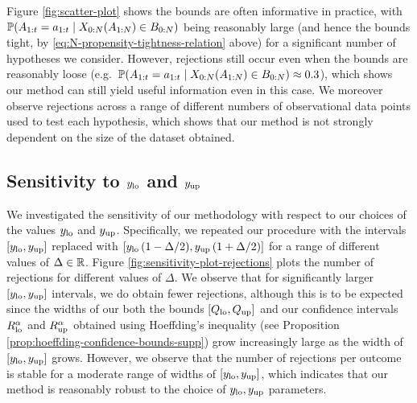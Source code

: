     Figure \ref{fig:scatter-plot} shows the bounds are often informative in practice, with $\mathbb{P}(A_{1:t} = a_{1:t} \mid X_{0:N}(A_{1:N}) \in B_{0:N})$ being reasonably large (and hence the bounds tight, by \eqref{eq:N-propensity-tightness-relation} above) for a significant number of hypotheses we consider.
    However, rejections still occur even when the bounds are reasonably loose (e.g.\ $\mathbb{P}(A_{1:t} = a_{1:t} \mid X_{0:N}(A_{1:N}) \in B_{0:N}) \approx 0.3$), which shows our method can still yield useful information even in this case.
    We moreover observe rejections across a range of different numbers of observational data points used to test each hypothesis, which shows that our method is not strongly dependent on the size of the dataset obtained. 

    \subsection{Sensitivity to $y_{\mathrm{lo}}$ and $y_{\mathrm{up}}$} \label{sec:sensitity-analysis-appendix}

    We investigated the sensitivity of our methodology with respect to our choices of the values $y_{\mathrm{lo}}$ and $y_{\mathrm{up}}$.
    Specifically, we repeated our procedure with the intervals $[y_{\mathrm{lo}}, y_{\mathrm{up}}]$ replaced with $[y_{\mathrm{lo}}\, (1- \Delta/2), y_{\mathrm{up}}\,(1 + \Delta/2)]$ for a range of different values of $\Delta \in \mathbb{R}$.
    Figure \ref{fig:sensitivity-plot-rejections} plots the number of rejections for different values of $\Delta$.
    We observe that for significantly larger $[y_{\mathrm{lo}}, y_{\mathrm{up}}]$ intervals, we do obtain fewer rejections, although this is to be expected since the widths of our both the bounds $[Q_{\mathrm{lo}}, Q_{\mathrm{up}}]$ and our confidence intervals $R_{\mathrm{lo}}^{\alpha}$ and $R_{\mathrm{up}}^{\alpha}$ obtained using Hoeffding's inequality (see Proposition \ref{prop:hoeffding-confidence-bounds-supp}) grow increasingly large as the width of $[y_{\mathrm{lo}}, y_{\mathrm{up}}]$ grows.
    However, we observe that the number of rejections per outcome is stable for a moderate range of widths of $[y_{\mathrm{lo}}, y_{\mathrm{up}}]$, which indicates that our method is reasonably robust to the choice of $y_{\mathrm{lo}}, y_{\mathrm{up}}$ parameters.



